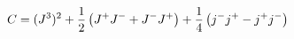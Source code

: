 \begin{equation}
C=(J^{3})^2+{1\over 2}\left(J^+J^-+J^-J^+\right)+{1\over
  4}\left(j^-j^+-j^+j^-\right)
\end{equation}

